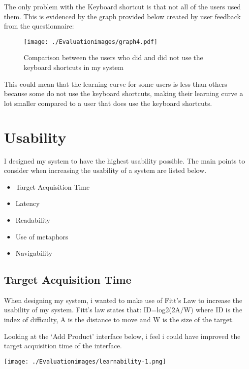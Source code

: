 The only problem with the Keyboard shortcut is that not all of the users used them. This is evidenced by the graph provided below created by user feedback from the questionnaire:

\begin{figure}[H]
\caption{Comparison between the users who did and did not use the keyboard shortcuts in my system}
\hfill\texttt{[image: ./Evaluationimages/graph4.pdf]}
\end{figure}

This could mean that the learning curve for some users is less than others because some do not use the keyboard shortcuts, making their learning curve a lot smaller compared to a user that does use the keyboard shortcuts.








\pagebreak
\section{Usability}

I designed my system to have the highest usability possible. The main points to consider when increasing the usability of a system are listed below.

\begin{itemize}
	\item{Target Acquisition Time}
	\item{Latency}
	\item{Readability}
	\item{Use of metaphors}
	\item{Navigability} 
\end{itemize}

\subsection{Target Acquisition Time}

When designing my system, i wanted to make use of Fitt's Law to increase the usability of my system. Fitt's law states that: ID=log2(2A/W) where ID is the index of difficulty, A is the distance to move and W is the size of the target.

Looking at the `Add Product' interface below, i feel i could have improved the target acquisition time of the interface.

\texttt{[image: ./Evaluationimages/learnability-1.png]}

